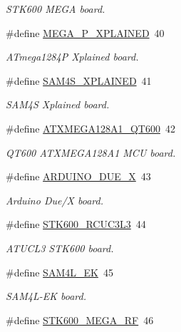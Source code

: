 \begin{DoxyCompactItemize}
\begin{DoxyCompactList}\small\item\em S\-T\-K600 M\-E\-G\-A board. \end{DoxyCompactList}\item 
\#define \hyperlink{group__group__common__boards_gac0cd34c69edc3e4bff3f60335ceb9523}{M\-E\-G\-A\-\_\-P\-\_\-\-X\-P\-L\-A\-I\-N\-E\-D}~40
\begin{DoxyCompactList}\small\item\em A\-Tmega1284\-P Xplained board. \end{DoxyCompactList}\item 
\#define \hyperlink{group__group__common__boards_gafbe1a5c573b19cb81096a5e74bf02c5b}{S\-A\-M4\-S\-\_\-\-X\-P\-L\-A\-I\-N\-E\-D}~41
\begin{DoxyCompactList}\small\item\em S\-A\-M4\-S Xplained board. \end{DoxyCompactList}\item 
\#define \hyperlink{group__group__common__boards_ga71c98fe89b8fdd9d764fe26eecb06d2d}{A\-T\-X\-M\-E\-G\-A128\-A1\-\_\-\-Q\-T600}~42
\begin{DoxyCompactList}\small\item\em Q\-T600 A\-T\-X\-M\-E\-G\-A128\-A1 M\-C\-U board. \end{DoxyCompactList}\item 
\#define \hyperlink{group__group__common__boards_gaada45a3e41c9f2ecf1332b408e9903ec}{A\-R\-D\-U\-I\-N\-O\-\_\-\-D\-U\-E\-\_\-\-X}~43
\begin{DoxyCompactList}\small\item\em Arduino Due/\-X board. \end{DoxyCompactList}\item 
\#define \hyperlink{group__group__common__boards_ga4a22ba3ca235e7f9401724437fe8b23e}{S\-T\-K600\-\_\-\-R\-C\-U\-C3\-L3}~44
\begin{DoxyCompactList}\small\item\em A\-T\-U\-C\-L3 S\-T\-K600 board. \end{DoxyCompactList}\item 
\#define \hyperlink{group__group__common__boards_ga28f30a48578d189acda09784bc5fabc8}{S\-A\-M4\-L\-\_\-\-E\-K}~45
\begin{DoxyCompactList}\small\item\em S\-A\-M4\-L-\/\-E\-K board. \end{DoxyCompactList}\item 
\#define \hyperlink{group__group__common__boards_ga7c1887e7b82fa3c46a3ed04ec1dcee3e}{S\-T\-K600\-\_\-\-M\-E\-G\-A\-\_\-\-R\-F}~46

\end{DoxyCompactItemize}

